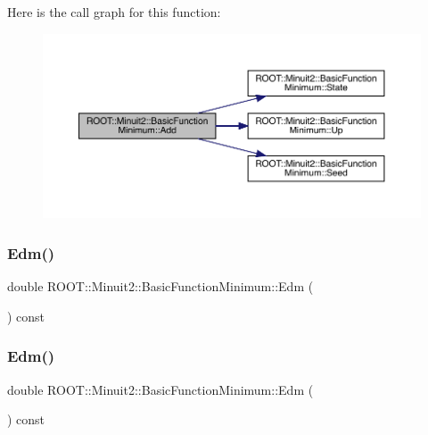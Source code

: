 Here is the call graph for this function\+:
\nopagebreak
\begin{figure}[H]
\begin{center}
\leavevmode
\includegraphics[width=350pt]{de/d25/classROOT_1_1Minuit2_1_1BasicFunctionMinimum_abd32f932e7a26883723b33c4a1402a85_cgraph}
\end{center}
\end{figure}
\mbox{\label{classROOT_1_1Minuit2_1_1BasicFunctionMinimum_abecb5c249e988f6f3f792e2bcc11d4a4}} 
\subsubsection{\texorpdfstring{Edm()}{Edm()}\hspace{0.1cm}{\footnotesize\ttfamily [1/3]}}
{\footnotesize\ttfamily double R\+O\+O\+T\+::\+Minuit2\+::\+Basic\+Function\+Minimum\+::\+Edm (\begin{DoxyParamCaption}{ }\end{DoxyParamCaption}) const\hspace{0.3cm}{\ttfamily [inline]}}

\mbox{\label{classROOT_1_1Minuit2_1_1BasicFunctionMinimum_abecb5c249e988f6f3f792e2bcc11d4a4}} 
\subsubsection{\texorpdfstring{Edm()}{Edm()}\hspace{0.1cm}{\footnotesize\ttfamily [2/3]}}
{\footnotesize\ttfamily double R\+O\+O\+T\+::\+Minuit2\+::\+Basic\+Function\+Minimum\+::\+Edm (\begin{DoxyParamCaption}{ }\end{DoxyParamCaption}) const\hspace{0.3cm}{\ttfamily [inline]}}

